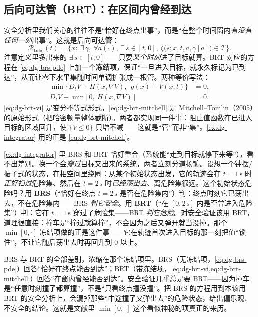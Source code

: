 \subsection{后向可达管（BRT）：在区间内曾经到达}
\label{sec:dg-brt}
安全分析里我们关心的往往不是“恰好在终点出事”，而是“在整个时间窗内\emph{有没有任何一刻}出事”。这就是后向可达\textbf{管}：
\begin{equation}
  \mathcal{R}_{\text{tube}}(t)=\Big\{x:\ \exists\,\gamma,\ \forall a(\cdot),\ \exists\,s\in[t,0],\ \zeta\big(s;x,t,a,\gamma[a]\big)\in\mathcal{T}\Big\}.
  \label{eq:dg-brt-def}
\end{equation}
注意定义里多出来的 $\exists\,s\in[t,0]$——只要\emph{某个时刻}进了目标就算。BRT 对应的方程在 \cref{eq:dg-brs-pde} 上加一个\textbf{冻结项}，保证“一旦进入目标，就永久标记为已到达”，从而让零下水平集随时间单调扩张成一根管。两种等价写法：
\begin{align}
  \min\Big\{D_t V+H(x,\nabla V),\ \ g(x)-V(x,t)\Big\}&=0, \label{eq:dg-brt-vi}\\
  D_t V+\min\big[\,0,\ H(x,\nabla V)\,\big]&=0. \label{eq:dg-brt-mitchell}
\end{align}
\cref{eq:dg-brt-vi} 是变分不等式形式，\cref{eq:dg-brt-mitchell} 是 Mitchell--Tomlin（2005）的原始形式（把哈密顿量整体截断）\cite{mitchell2005time}。两者都实现同一件事：阻止值函数在已进入目标的区域回升，使 $\{V\le0\}$ 只增不减——这就是“管”而非“集”。\cref{ex:dg-integrator} 用的正是 \cref{eq:dg-brt-mitchell}。

\begin{example}
\label{ex:dg-set-vs-tube}
\cref{ex:dg-integrator} 里 BRS 和 BRT 恰好重合（系统能“走到目标就停下来等”），看不出差别。换一个会\emph{穿过}目标又出来的系统，两者立刻分道扬镳。设想一个钟摆/振子式的状态，在相空间里绕圈：从某个初始状态出发，它的轨迹会在 $t=1\,\mathrm s$ 时\emph{正好扫过}危险集、然后在 $t=2\,\mathrm s$ 时\emph{已经荡出去}、离危险集很远。这个初始状态危险吗？用 \textbf{BRS}（“恰好在终点 $t=2\,\mathrm s$ 是否在危险集内”）判：终点时刻它已荡出去，不在危险集内——BRS \emph{判它安全}。用 \textbf{BRT}（“在 $[0,2\,\mathrm s]$ 内是否曾进入危险集”）判：它在 $t=1\,\mathrm s$ 穿过了危险集——BRT \emph{判它危险}。对安全验证该用 BRT，道理很直接：撞车是“撞过就算撞”，不会因为之后又弹开就当没撞。那个 $\min[0,\cdot]$ 冻结项做的正是这件事——它在轨迹首次进入目标的那一刻把值“锁住”，不让它随后荡出去时再回升到 0 以上。
\end{example}

\begin{insight}
BRS 与 BRT 的全部差别，浓缩在那个冻结项里。BRS（无冻结项，\cref{eq:dg-brs-pde}）回答“恰好在终点能否到达”；BRT（带冻结项，\cref{eq:dg-brt-vi,eq:dg-brt-mitchell}）回答“在窗内曾经能否到达”。安全验证几乎总是要 BRT——因为撞车是“任意时刻撞了都算撞”，不是“只看终点撞没撞”。把 BRS 的方程用到本该用 BRT 的安全分析上，会漏掉那些“中途撞了又弹出去”的危险状态，给出偏乐观、不安全的结论。这就是文献里 $\min[0,\cdot]$ 这个看似神秘的项真正的来历。
\end{insight}

